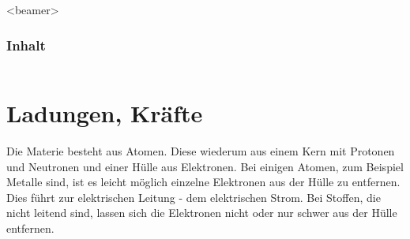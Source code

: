 \documentclass[a4paper, 10pt]{scrartcl}
\begin{document}
\begin{frame}
  \partpage
\end{frame}
\begin{frame}<beamer>
  \frametitle{Inhalt}

  \begin{columns}
    \tableofcontents[sections={7-12}]%
    \tableofcontents[sections={13-}]%
  \end{columns}

\end{frame}

\section{Ladungen, Kräfte}
Die Materie besteht aus Atomen. Diese wiederum aus einem Kern mit Protonen und Neutronen und einer Hülle aus Elektronen. Bei einigen Atomen, zum Beispiel Metalle sind, ist es leicht möglich einzelne Elektronen aus der Hülle zu entfernen. Dies führt zur elektrischen Leitung - dem elektrischen Strom. Bei Stoffen, die nicht leitend sind, lassen sich die Elektronen nicht oder nur schwer aus der Hülle entfernen.
\end{document}
